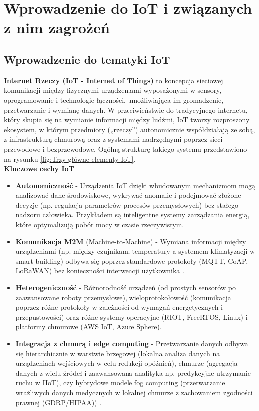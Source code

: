 \chapter{Wprowadzenie do IoT i związanych z nim zagrożeń}
\label{chap:rozdzial2}  
\section{Wprowadzenie do tematyki IoT}
\textbf{Internet Rzeczy (IoT - Internet of Things)} to koncepcja sieciowej komunikacji między fizycznymi urządzeniami wyposażonymi w sensory, oprogramowanie i technologie łączności, umożliwiająca im gromadzenie, przetwarzanie i wymianę danych. W przeciwieństwie do tradycyjnego internetu, który skupia się na wymianie informacji między ludźmi, IoT tworzy rozproszony ekosystem, w którym przedmioty („rzeczy”) autonomicznie współdziałają ze sobą, z infrastrukturą chmurową oraz z systemami nadrzędnymi poprzez sieci przewodowe i bezprzewodowe. Ogólną strukturę takiego systemu przedstawiono na rysunku \ref{fig:Trzy główne elementy IoT}.
\vspace{1cm}\\
\textbf{Kluczowe cechy IoT}
    \begin{itemize}
        \item \textbf{Autonomiczność} - Urządzenia IoT dzięki wbudowanym mechanizmom mogą analizować dane środowiskowe, wykrywać anomalie i podejmować złożone decyzje (np. regulacja parametrów procesów przemysłowych) bez stałego nadzoru człowieka. Przykładem są inteligentne systemy zarządzania energią, które optymalizują pobór mocy w czasie rzeczywistym.
        \item \textbf{Komunikacja M2M} (Machine-to-Machine) - Wymiana informacji między urządzeniami (np. między czujnikami temperatury a systemem klimatyzacji w smart building) odbywa się poprzez standardowe protokoły (MQTT, CoAP, LoRaWAN) bez konieczności interwencji użytkownika \cite{IEEE2413}.
        \item \textbf{Heterogeniczność } - Różnorodność urządzeń (od prostych sensorów po zaawansowane roboty przemysłowe), wieloprotokołowość (komunikacja poprzez różne protokoły w zależności od wymagań energetycznych i przepustowości) oraz różne systemy operacyjne (RIOT, FreeRTOS, Linux) i platformy chmurowe (AWS IoT, Azure Sphere).
        \item \textbf{Integracja z chmurą i edge computing} - Przetwarzanie danych odbywa się hierarchicznie w warstwie brzegowej (lokalna analiza danych na urządzeniach wejściowych w celu redukcji opóźnień), chmurze (agregacja danych z wielu źródeł i zaawansowana analityka np. predykcyjne utrzymanie ruchu w IIoT), czy hybrydowe modele fog computing (przetwarzanie wrażliwych danych medycznych w lokalnej chmurze z zachowaniem zgodności prawnej (GDRP/HIPAA)) \cite{bonomi2012fog}.
    \end{itemize}

